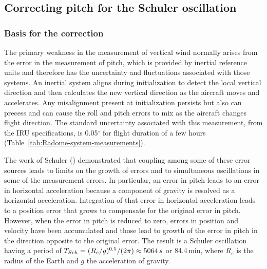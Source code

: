 \documentclass[12pt,twoside,english]{article}\usepackage[]{graphicx}\usepackage[]{color}
\let\stdsection\section
\renewcommand{\section}{\newpage\stdsection}
\let\OrgIndex\index
\renewcommand*{\index}[1]{\OrgIndex{#1}}
\begin{document}
\subsection{Correcting pitch for the Schuler oscillation\label{sub:Schuler}}





% 



\subsubsection{Basis for the correction}

The primary weakness in the measurement of vertical wind normally arises from the error in the measurement of pitch, which is provided by inertial reference units and therefore has the uncertainty and fluctuations associated with those systems. An inertial system aligns during initialization to detect the local vertical direction and then calculates the new vertical direction as the aircraft moves and accelerates. Any misalignment present at initialization persists but also can precess and can cause the roll and pitch errors to mix as the aircraft changes flight direction. The standard uncertainty associated with this measurement, from the IRU specifications, is 0.05$^{\circ}$ for flight duration of a few hours (Table~\ref{tab:Radome-system-measurements}).

The work of Schuler (\citet{Schuler1923}) demonstrated that coupling among some of these error sources leads to limits on the growth of errors and to simultaneous oscillations in some of the measurement errors. In particular, an error in pitch leads to an error in horizontal acceleration because a component of gravity is resolved as a horizontal acceleration. Integration of that error in horizontal acceleration leads to a position error that grows to compensate for the original error in pitch. However, when the error in pitch is reduced to zero, errors in position and velocity have been accumulated and those lead to growth of the error in pitch in the direction opposite to the original error. The result is a Schuler oscillation having a period of $T_{Sch}=(R_{e}/g)^{0.5}/(2\pi)\approx5064\thinspace s$ or 84.4\,min, where $R_{e}$ is the radius of the Earth and $g$ the acceleration of gravity. 
\end{document}
